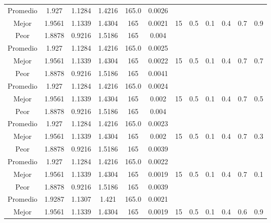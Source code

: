 \begin{table}[h!]
\begin{center}
\begin{tabular}{|c|c|c|c|c|c|c|c|c|c|c|c|}
        \hline
        \hline
            Promedio  & 1.927 & 1.1284 & 1.4216 & 165.0 & 0.0026 &  &  &  &  &  & \\
            \cline{1-6}
            Mejor & 1.9561 & 1.1339  & 1.4304 & 165 & 0.0021 & 15 & 0.5 & 0.1 & 0.4 & 0.7 & 0.9\\
            \cline{1-6}
            Peor & 1.8878 & 0.9216  & 1.5186 & 165 & 0.004 &  &  &  &  &  & \\
        \hline
        \hline
            Promedio  & 1.927 & 1.1284 & 1.4216 & 165.0 & 0.0025 &  &  &  &  &  & \\
            \cline{1-6}
            Mejor & 1.9561 & 1.1339  & 1.4304 & 165 & 0.0022 & 15 & 0.5 & 0.1 & 0.4 & 0.7 & 0.7\\
            \cline{1-6}
            Peor & 1.8878 & 0.9216  & 1.5186 & 165 & 0.0041 &  &  &  &  &  & \\
        \hline
        \hline
            Promedio  & 1.927 & 1.1284 & 1.4216 & 165.0 & 0.0024 &  &  &  &  &  & \\
            \cline{1-6}
            Mejor & 1.9561 & 1.1339  & 1.4304 & 165 & 0.002 & 15 & 0.5 & 0.1 & 0.4 & 0.7 & 0.5\\
            \cline{1-6}
            Peor & 1.8878 & 0.9216  & 1.5186 & 165 & 0.004 &  &  &  &  &  & \\
        \hline
        \hline
            Promedio  & 1.927 & 1.1284 & 1.4216 & 165.0 & 0.0023 &  &  &  &  &  & \\
            \cline{1-6}
            Mejor & 1.9561 & 1.1339  & 1.4304 & 165 & 0.002 & 15 & 0.5 & 0.1 & 0.4 & 0.7 & 0.3\\
            \cline{1-6}
            Peor & 1.8878 & 0.9216  & 1.5186 & 165 & 0.0039 &  &  &  &  &  & \\
        \hline
        \hline
            Promedio  & 1.927 & 1.1284 & 1.4216 & 165.0 & 0.0022 &  &  &  &  &  & \\
            \cline{1-6}
            Mejor & 1.9561 & 1.1339  & 1.4304 & 165 & 0.0019 & 15 & 0.5 & 0.1 & 0.4 & 0.7 & 0.1\\
            \cline{1-6}
            Peor & 1.8878 & 0.9216  & 1.5186 & 165 & 0.0039 &  &  &  &  &  & \\
        \hline
        \hline
            Promedio  & 1.9287 & 1.1307 & 1.421 & 165.0 & 0.0021 &  &  &  &  &  & \\
            \cline{1-6}
            Mejor & 1.9561 & 1.1339  & 1.4304 & 165 & 0.0019 & 15 & 0.5 & 0.1 & 0.4 & 0.6 & 0.9\\

\end{tabular}
\end{center}
\end{table}
